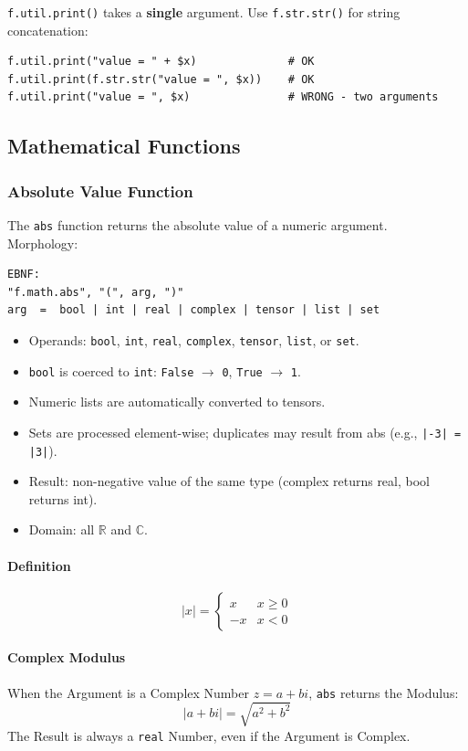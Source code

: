 \texttt{f.util.print()} takes a \textbf{single} argument. Use \texttt{f.str.str()} for string concatenation:
\begin{verbatim}
f.util.print("value = " + $x)              # OK
f.util.print(f.str.str("value = ", $x))    # OK
f.util.print("value = ", $x)               # WRONG - two arguments
\end{verbatim}

\subsection{Mathematical Functions}
\subsubsection{Absolute Value Function}
The \texttt{abs} function returns the absolute value of a numeric argument.\\
Morphology:
\begin{verbatim}
EBNF:
"f.math.abs", "(", arg, ")"
arg  =  bool | int | real | complex | tensor | list | set
\end{verbatim}
\begin{itemize}
\item Operands: \texttt{bool}, \texttt{int}, \texttt{real}, \texttt{complex}, \texttt{tensor}, \texttt{list}, or \texttt{set}.
\item \texttt{bool} is coerced to \texttt{int}: \texttt{False} $\to$ \texttt{0}, \texttt{True} $\to$ \texttt{1}.
\item Numeric lists are automatically converted to tensors.
\item Sets are processed element-wise; duplicates may result from abs (e.g., \texttt{|-3| = |3|}).
\item Result: non-negative value of the same type (complex returns real, bool returns int).
\item Domain: all $\mathbb{R}$ and $\mathbb{C}$.
\end{itemize}

\paragraph{Definition}
\[
|x| = \begin{cases} x & x \geq 0 \\ -x & x < 0 \end{cases}
\]

\paragraph{Complex Modulus}
When the Argument is a Complex Number $z = a + bi$, \texttt{abs} returns the Modulus:
\[
|a + bi| = \sqrt{a^2 + b^2}
\]
The Result is always a \texttt{real} Number, even if the Argument is Complex.

